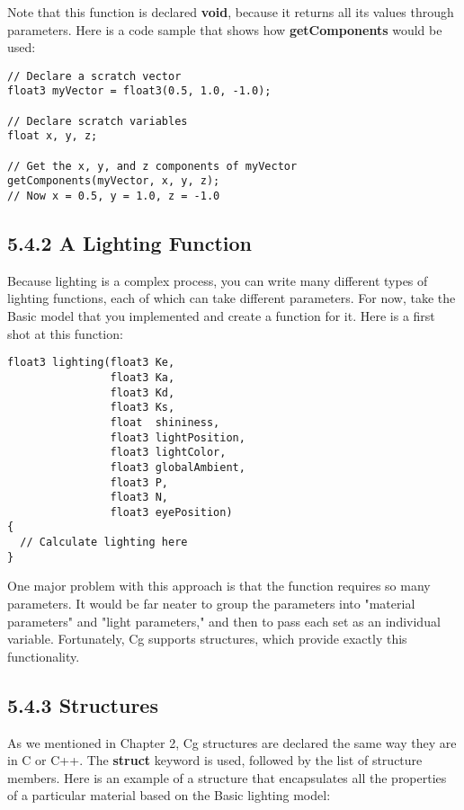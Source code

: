 \documentclass[../main.tex]{subfiles}
\begin{document}
Note that this function is declared \textbf{void}, because it returns all its values through parameters. Here is a code sample that shows how \textbf{getComponents} would be used:

\FloatBarrier
\begin{lstlisting}
// Declare a scratch vector
float3 myVector = float3(0.5, 1.0, -1.0);

// Declare scratch variables
float x, y, z;

// Get the x, y, and z components of myVector
getComponents(myVector, x, y, z);
// Now x = 0.5, y = 1.0, z = -1.0
\end{lstlisting}
\FloatBarrier

\subsection{5.4.2 A Lighting Function}

Because lighting is a complex process, you can write many different types of lighting functions, each of which can take different parameters. For now, take the Basic model that you implemented and create a function for it. Here is a first shot at this function:

\FloatBarrier
\begin{lstlisting}
float3 lighting(float3 Ke,
                float3 Ka,
                float3 Kd,
                float3 Ks,
                float  shininess,
                float3 lightPosition,
                float3 lightColor,
                float3 globalAmbient,
                float3 P,
                float3 N,
                float3 eyePosition)
{
  // Calculate lighting here
}
\end{lstlisting}
\FloatBarrier

One major problem with this approach is that the function requires so many parameters. It would be far neater to group the parameters into "material parameters" and "light parameters," and then to pass each set as an individual variable. Fortunately, Cg supports structures, which provide exactly this functionality.

\subsection{5.4.3 Structures}

As we mentioned in Chapter 2, Cg structures are declared the same way they are in C or C++. The \textbf{struct} keyword is used, followed by the list of structure members. Here is an example of a structure that encapsulates all the properties of a particular material based on the Basic lighting model:
\end{document}
